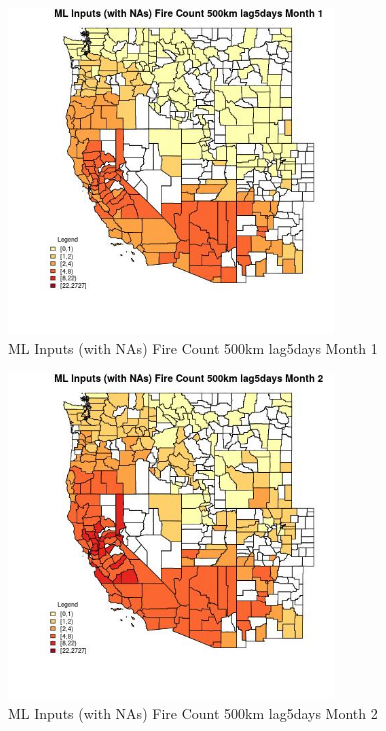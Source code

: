\begin{figure} 
\centering  
\includegraphics[width=0.77\textwidth]{Code_Outputs/Report_ML_input_PM25_Step4_part_f_de_duplicated_aveswNAs_CountyFire_Count_500km_lag5daysmedianMonth1.jpg} 
\caption{\label{fig:Report_ML_input_PM25_Step4_part_f_de_duplicated_aveswNAsCountyFire_Count_500km_lag5daysmedianMonth1}ML Inputs (with NAs) Fire Count 500km lag5days Month 1} 
\end{figure} 
 

\begin{figure} 
\centering  
\includegraphics[width=0.77\textwidth]{Code_Outputs/Report_ML_input_PM25_Step4_part_f_de_duplicated_aveswNAs_CountyFire_Count_500km_lag5daysmedianMonth2.jpg} 
\caption{\label{fig:Report_ML_input_PM25_Step4_part_f_de_duplicated_aveswNAsCountyFire_Count_500km_lag5daysmedianMonth2}ML Inputs (with NAs) Fire Count 500km lag5days Month 2} 
\end{figure} 
 


